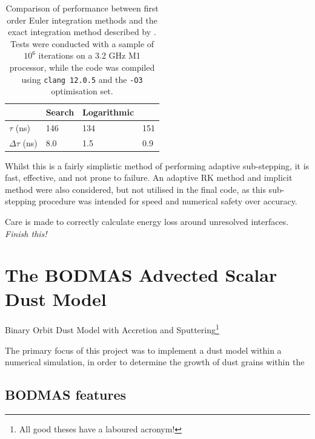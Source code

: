 \begin{table}[h]
  \centering
  \begin{tabular}{llll}
  \hline
  & Search & Logarithmic & \textcite{townsendExactIntegrationScheme2009} \\ \hline
  $\tau$ (\si{\nano\second}) & 146 & 134 & 151 \\
  $\Delta \tau$ (\si{\nano\second}) & 8.0 & 1.5 & 0.9 \\ \hline
  \end{tabular}
  \caption[Cooling method performance comparison]{Comparison of performance between first order Euler integration methods and the exact integration method described by \cite{townsendExactIntegrationScheme2009}. Tests were conducted with a sample of $10^6$ iterations on a 3.2 \si{\giga\hertz} M1 processor, while the code was compiled using \texttt{clang 12.0.5} and the \texttt{-O3} optimisation set.}
  \label{tab:cooling-loop-speed-comp}
\end{table}

Whilst this is a fairly simplistic method of performing adaptive sub-stepping, it is fast, effective, and not prone to failure. An adaptive RK method and implicit method were also considered, but not utilised in the final code, as this sub-stepping procedure was intended for speed and numerical safety over accuracy.


Care is made to correctly calculate energy loss around unresolved interfaces. \textit{Finish this!}



\section{The BODMAS Advected Scalar Dust Model}
\label{sec:bodmas}

Binary Orbit Dust Model with Accretion and Sputtering\footnote{All good theses have a laboured acronym!}

The primary focus of this project was to implement a dust model within a numerical simulation, in order to determine the growth of dust grains within the 

\subsection{BODMAS features}

